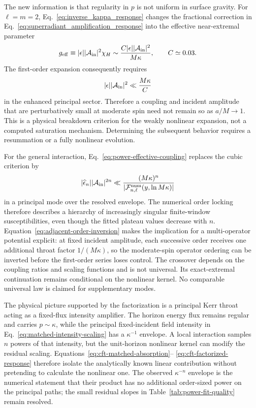 \documentclass[aps,prd,twocolumn,10pt,nofootinbib,superscriptaddress,floatfix]{revtex4-2}
\begin{document}
The new information is that regularity in $p$ is not uniform in surface
gravity.  For $\ell=m=2$, Eq.~\eqref{eq:inverse_kappa_response} changes the
fractional correction in Eq.~\eqref{eq:superradiant_amplification_response}
into the effective near-extremal parameter
\begin{equation}
 g_{\rm eff}
 \equiv |\epsilon||{\cal A}_{\rm in}|^2\chi_H
 \sim \frac{C|\epsilon||{\cal A}_{\rm in}|^2}{M\kappa},
 \qquad C\simeq0.03 .
 \label{eq:effective_near_extremal_coupling}
\end{equation}
The first-order expansion consequently requires
\begin{equation}
 |\epsilon||{\cal A}_{\rm in}|^2\ll\frac{M\kappa}{C}
 \label{eq:near_extremal_weak_condition}
\end{equation}
in the enhanced principal sector.  Therefore a coupling and incident
amplitude that are perturbatively small at moderate spin need not remain so as
$a/M\to1$.  This is a physical breakdown criterion for the weakly nonlinear
expansion, not a computed saturation mechanism.  Determining the subsequent
behavior requires a resummation or a fully nonlinear evolution.

For the general interaction, Eq.~\eqref{eq:power-effective-coupling} replaces
the cubic criterion by
\begin{equation}
 |\widehat\epsilon_n||{\cal A}_{\rm in}|^{2n}
 \ll \frac{(M\kappa)^n}
 {|{\cal F}^{\rm num}_{n,\ell}(y,\ln M\kappa)|}
 \label{eq:power-near-extremal-weak-condition}
\end{equation}
in a principal mode over the resolved envelope.  The numerical order locking
therefore describes a hierarchy of increasingly singular finite-window
susceptibilities, even though the fitted plateau values decrease with $n$.
Equation~\eqref{eq:adjacent-order-inversion} makes the implication for a
multi-operator potential explicit: at fixed incident amplitude, each
successive order receives one additional throat factor $1/(M\kappa)$, so the
moderate-spin operator ordering can be inverted before the first-order series
loses control.  The crossover depends on the coupling ratios and scaling
functions and is not universal.
Its exact-extremal continuation remains conditional on the nonlinear kernel.
No comparable universal law is claimed for supplementary modes.

The physical picture supported by the factorization is a principal Kerr throat
acting as a fixed-flux intensity amplifier.  The horizon energy flux remains
regular and carries $p\sim\kappa$, while the principal fixed-incident field
intensity in Eq.~\eqref{eq:matched-intensity-scaling} has a
$\kappa^{-1}$ envelope.  A local interaction samples $n$ powers of that
intensity, but the unit-horizon nonlinear kernel can modify the residual
scaling.  Equations~\eqref{eq:cft-matched-absorption}--
\eqref{eq:cft-factorized-response} therefore isolate the analytically known
linear contribution without pretending to calculate the nonlinear one.  The
observed $\kappa^{-n}$ envelope is the numerical statement that their product
has no additional order-sized power on the principal paths; the small residual
slopes in Table~\ref{tab:power-fit-quality} remain resolved.
\end{document}
